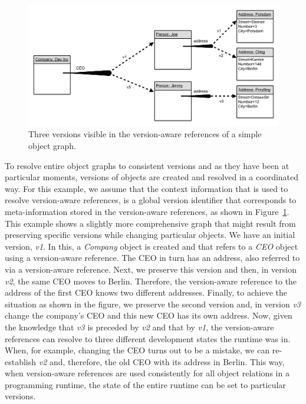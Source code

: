 \begin{figure}[h]
    \centering
    \includegraphics[width=\textwidth]{figures/MultipleVersionAwareReferences.png}
    \caption{Three versions visible in the version-aware references of a simple object graph.}
    \label{fig:MoreVersionAwareReferences}
\end{figure}

To resolve entire object graphs to consistent versions and as they have been at particular moments, versions of objects are created and resolved in a coordinated way.
For this example, we assume that the context information that is used to resolve version-aware references, is a global version identifier that corresponds to meta-information stored in the version-aware references, as shown in Figure~\ref{fig:MoreVersionAwareReferences}.
This example shows a slightly more comprehensive graph that might result from preserving specific versions while changing particular objects.
We have an initial version, \emph{v1}.
In this, a \emph{Company} object is created and that refers to a \emph{CEO} object using a version-aware reference.
The CEO in turn has an address, also referred to via a version-aware reference.
Next, we preserve this version and then, in version \emph{v2}, the same CEO moves to Berlin.
Therefore, the version-aware reference to the address of the first CEO knows two different addresses.
Finally, to achieve the situation as shown in the figure, we preserve the second version and, in version \emph{v3} change the company's CEO and this new CEO has its own address.
Now, given the knowledge that \emph{v3} is preceded by \emph{v2} and that by \emph{v1}, the version-aware references can resolve to three different development states the runtime was in.
When, for example, changing the CEO turns out to be a mistake, we can re-establish \emph{v2} and, therefore, the old CEO with its address in Berlin.
This way, when version-aware references are used consistently for all object relations in a programming runtime, the state of the entire runtime can be set to particular versions.

